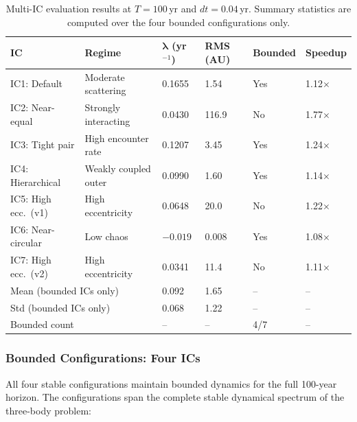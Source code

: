 \documentclass[12pt]{article}
\begin{document}
\begin{table}[H]
\centering
\caption{Multi-IC evaluation results at $T=100$\,yr and $dt=0.04$\,yr. Summary statistics are computed over the four bounded configurations only.}
\label{tab:multi_ic}
\begin{tabular}{@{}llllll@{}}
\toprule
\textbf{IC} & \textbf{Regime} & $\boldsymbol{\lambda}$ (yr$^{-1}$) & \textbf{RMS (AU)} & \textbf{Bounded} & \textbf{Speedup} \\
\midrule
IC1: Default & Moderate scattering & 0.1655 & 1.54 & Yes & 1.12$\times$ \\
IC2: Near-equal & Strongly interacting & 0.0430 & 116.9 & No & 1.77$\times$ \\
IC3: Tight pair & High encounter rate & 0.1207 & 3.45 & Yes & 1.24$\times$ \\
IC4: Hierarchical & Weakly coupled outer & 0.0990 & 1.60 & Yes & 1.14$\times$ \\
IC5: High ecc.\ (v1) & High eccentricity & 0.0648 & 20.0 & No & 1.22$\times$ \\
IC6: Near-circular & Low chaos & $-0.019$ & 0.008 & Yes & 1.08$\times$ \\
IC7: High ecc.\ (v2) & High eccentricity & 0.0341 & 11.4 & No & 1.11$\times$ \\
\midrule
\multicolumn{2}{l}{Mean (bounded ICs only)} & 0.092 & 1.65 & -- & -- \\
\multicolumn{2}{l}{Std (bounded ICs only)} & 0.068 & 1.22 & -- & -- \\
\multicolumn{2}{l}{Bounded count} & -- & -- & 4/7 & -- \\
\bottomrule
\end{tabular}
\end{table}

\subsubsection{Bounded Configurations: Four ICs}
\label{sec:bounded_ics}

All four stable configurations maintain bounded dynamics for the full 100-year
horizon. The configurations span the complete stable dynamical spectrum of the
three-body problem:
\end{document}
